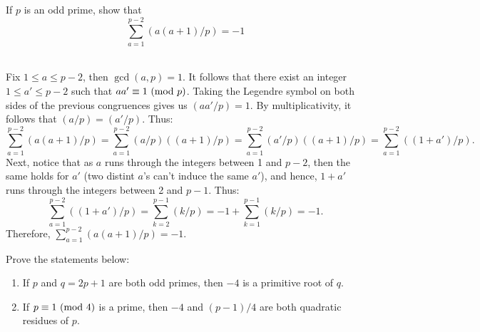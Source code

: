 \begin{exercise}
    If $p$ is an odd prime, show that
    $$\sum_{a = 1}^{p-2}(a(a+1)/p) = -1$$
     \\
\end{exercise}

\begin{solution}
    Fix $1 \leq a \leq p-2$, then $\gcd(a,p) = 1$. It follows that there exist an integer $1 \leq a' \leq p-2$ such that $aa' \equiv 1 \ (\mathrm{mod}\ p)$. Taking the Legendre symbol on both sides of the previous congruences gives us $(aa'/p) = 1$. By multiplicativity, it follows that $(a/p) = (a'/p)$. Thus:
    $$\sum_{a=1}^{p-2}(a(a+1)/p) = \sum_{a=1}^{p-2}(a/p)((a+1)/p) = \sum_{a=1}^{p-2}(a'/p)((a+1)/p) = \sum_{a=1}^{p-2}((1+a')/p).$$
    Next, notice that as $a$ runs through the integers between 1 and $p-2$, then the same holds for $a'$ (two distint $a$'s can't induce the same $a'$), and hence, $1 + a'$ runs through the integers between 2 and $p-1$. Thus:
    $$\sum_{a = 1}^{p-2}((1+a')/p) = \sum_{k=2}^{p-1}(k/p) = -1 + \sum_{k=1}^{p-1}(k/p) = -1.$$
    Therefore, $\sum_{a=1}^{p-2}(a(a+1)/p) = -1$. \\
\end{solution}

\begin{exercise}
    Prove the statements below:
    \begin{enumerate}
        \item If $p$ and $q = 2p+1$ are both odd primes, then $-4$ is a primitive root of $q$.
        \item If $p \equiv 1 \ (\mathrm{mod}\ 4)$ is a prime, then $-4$ and $(p-1)/4$ are both quadratic residues of $p$. \\
    \end{enumerate}
\end{exercise}

